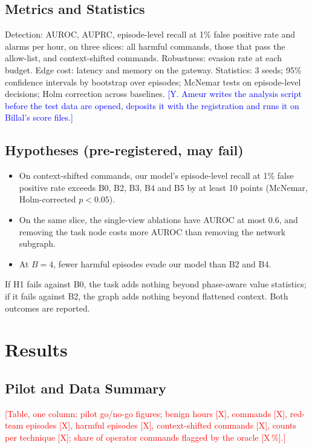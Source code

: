 \documentclass[journal]{IEEEtran}
\newcommand{\billal}[1]{\textcolor{red}{#1}}
\newcommand{\yulliwas}[1]{\textcolor{blue}{#1}}
\begin{document}
\subsection{Metrics and Statistics}
Detection: AUROC, AUPRC, episode-level recall at 1\% false positive rate and alarms per hour, on three slices: all harmful commands, those that pass the allow-list, and context-shifted commands. Robustness: evasion rate at each budget. Edge cost: latency and memory on the gateway. Statistics: 3 seeds; 95\% confidence intervals by bootstrap over episodes; McNemar tests on episode-level decisions; Holm correction across baselines. \yulliwas{[Y. Ameur writes the analysis script before the test data are opened, deposits it with the registration and runs it on Billal's score files.]}

\subsection{Hypotheses (pre-registered, may fail)}
\begin{itemize}
\item[\textbf{H1}] On context-shifted commands, our model's episode-level recall at 1\% false positive rate exceeds B0, B2, B3, B4 and B5 by at least 10 points (McNemar, Holm-corrected $p<0.05$).
\item[\textbf{H2}] On the same slice, the single-view ablations have AUROC at most 0.6, and removing the task node costs more AUROC than removing the network subgraph.
\item[\textbf{H3}] At $B=4$, fewer harmful episodes evade our model than B2 and B4.
\end{itemize}
If H1 fails against B0, the task adds nothing beyond phase-aware value statistics; if it fails against B2, the graph adds nothing beyond flattened context. Both outcomes are reported.

\section{Results}\label{sec:results}
\subsection{Pilot and Data Summary}
\billal{[Table, one column: pilot go/no-go figures; benign hours [X], commands [X], red-team episodes [X], harmful episodes [X], context-shifted commands [X], counts per technique [X]; share of operator commands flagged by the oracle [X\,\%].]}
\end{document}
